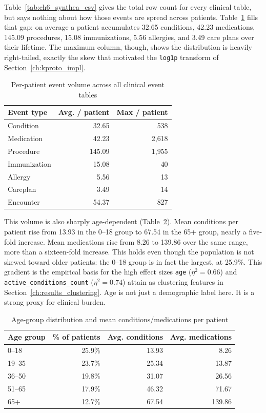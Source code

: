 Table~\ref{tab:ch6_synthea_csv} gives the total row count for every clinical table, but says nothing about how those events are spread across patients. Table~\ref{tab:ch6_per_patient} fills that gap: on average a patient accumulates 32.65 conditions, 42.23 medications, 145.09 procedures, 15.08 immunizations, 5.56 allergies, and 3.49 care plans over their lifetime. The maximum column, though, shows the distribution is heavily right-tailed, exactly the skew that motivated the \texttt{log1p} transform of Section~\ref{ch:kproto_impl}.

\begin{table}[H]
\centering
\begin{tabular}{lrr}
\hline
\textbf{Event type} & \textbf{Avg. / patient} & \textbf{Max / patient} \\
\hline
Condition     & 32.65  & 538 \\
Medication    & 42.23  & 2{,}618 \\
Procedure     & 145.09 & 1{,}955 \\
Immunization  & 15.08  & 40 \\
Allergy       & 5.56   & 13 \\
Careplan      & 3.49   & 14 \\
Encounter     & 54.37  & 827 \\
\hline
\end{tabular}
\caption{Per-patient event volume across all clinical event tables}
\label{tab:ch6_per_patient}
\end{table}

This volume is also sharply age-dependent (Table~\ref{tab:ch6_age_burden}). Mean conditions per patient rise from 13.93 in the 0--18 group to 67.54 in the 65+ group, nearly a five-fold increase. Mean medications rise from 8.26 to 139.86 over the same range, more than a sixteen-fold increase. This holds even though the population is not skewed toward older patients: the 0--18 group is in fact the largest, at 25.9\%. This gradient is the empirical basis for the high effect sizes \texttt{age} ($\eta^2{=}0.66$) and \texttt{active\_conditions\_count} ($\eta^2{=}0.74$) attain as clustering features in Section~\ref{ch:results_clustering}. Age is not just a demographic label here. It is a strong proxy for clinical burden.

\begin{table}[H]
\centering
\begin{tabular}{lrrr}
\hline
\textbf{Age group} & \textbf{\% of patients} & \textbf{Avg. conditions} & \textbf{Avg. medications} \\
\hline
0--18  & 25.9\% & 13.93 & 8.26 \\
19--35 & 23.7\% & 25.34 & 13.87 \\
36--50 & 19.8\% & 31.07 & 26.56 \\
51--65 & 17.9\% & 46.32 & 71.67 \\
65+    & 12.7\% & 67.54 & 139.86 \\
\hline
\end{tabular}
\caption{Age-group distribution and mean conditions/medications per patient}
\label{tab:ch6_age_burden}
\end{table}

